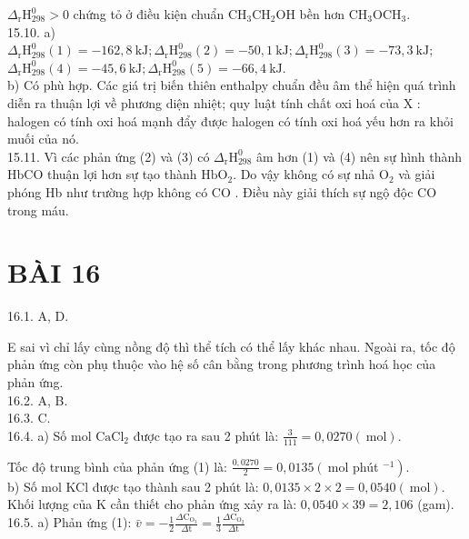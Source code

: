 \documentclass[10pt]{article}
\begin{document}
$\Delta_{\mathrm{r}} \mathrm{H}_{298}^{0}>0$ chứng tỏ ở điều kiện chuẩn $\mathrm{CH}_{3} \mathrm{CH}_{2} \mathrm{OH}$ bền hơn $\mathrm{CH}_{3} \mathrm{OCH}_{3}$.\\
15.10. a) $\Delta_{\mathrm{r}} \mathrm{H}_{298}^{0}(1)=-162,8 \mathrm{~kJ} ; \Delta_{\mathrm{r}} \mathrm{H}_{298}^{0}(2)=-50,1 \mathrm{~kJ} ; \Delta_{\mathrm{r}} \mathrm{H}_{298}^{0}(3)=-73,3 \mathrm{~kJ}$; $\Delta_{\mathrm{r}} \mathrm{H}_{298}^{0}(4)=-45,6 \mathrm{~kJ} ; \Delta_{\mathrm{r}} \mathrm{H}_{298}^{0}(5)=-66,4 \mathrm{~kJ}$.\\
b) Có phù hợp. Các giá trị biến thiên enthalpy chuẩn đều âm thể hiện quá trình diễn ra thuận lợi về phương diện nhiệt; quy luật tính chất oxi hoá của X : halogen có tính oxi hoá mạnh đẩy được halogen có tính oxi hoá yếu hơn ra khỏi muối của nó.\\
15.11. Vì các phản ứng (2) và (3) có $\Delta_{\mathrm{r}} \mathrm{H}_{298}^{0}$ âm hơn (1) và (4) nên sự hình thành HbCO thuận lợi hơn sự tạo thành $\mathrm{HbO}_{2}$. Do vậy không có sự nhả $\mathrm{O}_{2}$ và giải phóng Hb như trường hợp không có CO . Điều này giải thích sự ngộ độc CO trong máu.

\section*{BÀI 16}
16.1. A, D.

E sai vì chỉ lấy cùng nồng độ thì thể tích có thể lấy khác nhau. Ngoài ra, tốc độ phản ứng còn phụ thuộc vào hệ số cân bằng trong phương trình hoá học của phản ứng.\\
16.2. A, B.\\
16.3. C.\\
16.4. a) Số mol $\mathrm{CaCl}_{2}$ được tạo ra sau 2 phút là: $\frac{3}{111}=0,0270(\mathrm{~mol})$.

Tốc độ trung bình của phản ứng (1) là: $\frac{0,0270}{2}=0,0135\left(\mathrm{~mol}\right.$ phút $\left.^{-1}\right)$.\\
b) Số mol KCl được tạo thành sau 2 phút là: $0,0135 \times 2 \times 2=0,0540(\mathrm{~mol})$. Khối lượng của K cần thiết cho phản ứng xảy ra là: $0,0540 \times 39=2,106$ (gam).\\
16.5. a) Phản ứng (1): $\bar{v}=-\frac{1}{2} \frac{\Delta \mathrm{C}_{\mathrm{O}_{3}}}{\Delta \mathrm{t}}=\frac{1}{3} \frac{\Delta \mathrm{C}_{\mathrm{O}_{2}}}{\Delta \mathrm{t}}$
\end{document}
